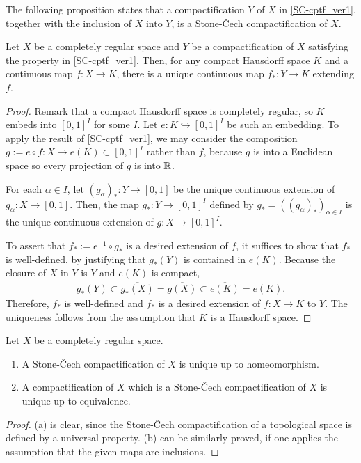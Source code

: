The following proposition states that a compactification $Y$ of $X$ in \cref{SC-cptf_ver1}, together with the inclusion of $X$ into $Y$, is a Stone-\v{C}ech compactification of $X$.
\begin{prop}\label{SC-cptf existence for CReg spaces}
    Let $X$ be a completely regular space and $Y$ be a compactification of $X$ satisfying the property in \cref{SC-cptf_ver1}.
    Then, for any compact Hausdorff space $K$ and a continuous map $f: X\rightarrow K$, there is a unique continuous map $f_*: Y\rightarrow K$ extending $f$.
\end{prop}
\begin{proof}
    Remark that a compact Hausdorff space is completely regular, so $K$ embeds into $[0, 1]^I$ for some $I$.
    Let $e: K\hookrightarrow[0, 1]^I$ be such an embedding.
    To apply the result of \cref{SC-cptf_ver1}, we may consider the composition $g:=e\circ f: X\rightarrow e(K)\subset[0, 1]^I$ rather than $f$, because $g$ is into a Euclidean space so every projection of $g$ is into ${\mathbb{R}}$.
    
    For each $\alpha\in I$, let $(g_\alpha)_*: Y\rightarrow[0, 1]$ be the unique continuous extension of $g_\alpha: X\rightarrow[0, 1]$.
    Then, the map $g_*: Y\rightarrow[0, 1]^I$ defined by $g_*=((g_\alpha)_*)_{\alpha\in I}$ is the unique continuous extension of $g: X\rightarrow[0, 1]^I$.
    
    To assert that $f_*:=e^{-1}\circ g_*$ is a desired extension of $f$, it suffices to show that $f_*$ is well-defined, by justifying that $g_*(Y)$ is contained in $e(K)$.
    Because the closure of $X$ in $Y$ is $Y$ and $e(K)$ is compact,
    \begin{align*}
        g_*(Y)\subset\overline{g_*(X)}=\overline{g(X)}\subset\overline{e(K)}=e(K).
    \end{align*}
    Therefore, $f_*$ is well-defined and $f_*$ is a desired extension of $f: X\rightarrow K$ to $Y$.
    The uniqueness follows from the assumption that $K$ is a Hausdorff space.
\end{proof}

\begin{prop}
    Let $X$ be a completely regular space.
    \begin{enumerate}
        \item[(a)]
        {
            A Stone-\v{C}ech compactification of $X$ is unique up to homeomorphism.
        }
        \item[(b)]
        {
            A compactification of $X$ which is a Stone-\v{C}ech compactification of $X$ is unique up to equivalence.
        }
    \end{enumerate}
\end{prop}
\begin{proof}
    (a) is clear, since the Stone-\v{C}ech compactification of a topological space is defined by a universal property.
    (b) can be similarly proved, if one applies the assumption that the given maps are inclusions.
\end{proof}

